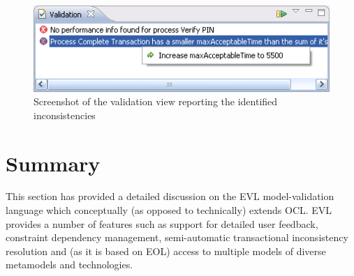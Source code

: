 \begin{figure}[h]
    \centering
    \includegraphics{images/Validation.png}
    \caption{Screenshot of the validation view reporting the identified inconsistencies}
    \label{fig:Validation}
\end{figure}

\section{Summary}

This section has provided a detailed discussion on the EVL model-validation language which conceptually (as opposed to technically) extends OCL. EVL provides a number of features such as support for detailed user feedback, constraint dependency management, semi-automatic transactional inconsistency resolution and (as it is based on EOL) access to multiple models of diverse metamodels and technologies.

